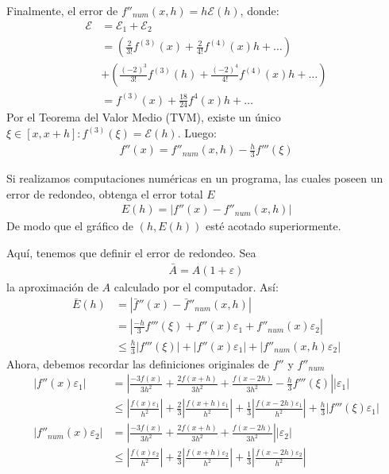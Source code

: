 Finalmente, el error de $f''_{num}(x,h)=h\mathcal{E}(h)$, donde:
\begin{align*}
    \mathcal{E}&=\mathcal{E}_1+\mathcal{E}_2\\
    &=\left(\frac{2}{3!}f^{(3)}(x)+\frac{2}{4!}f^{(4)}(x)h+\dots\right)\\
    &+\left(\frac{(-2)^3}{3!}f^{(3)}(h)+\frac{(-2)^4}{4!}f^{(4)}(x)h+\dots\right)\\
    &=f^{(3)}(x)+\frac{18}{24}f^{4}(x)h+\dots
\end{align*}
Por el Teorema del Valor Medio (TVM), existe un único $\xi \in [x,x+h]:f^{(3)}(\xi)=\mathcal{E}(h)$. Luego:
\begin{align*}
    f''(x)=f''_{num}(x,h)-\frac{h}{3}f'''(\xi)
\end{align*}
\begin{exercise}
    Si realizamos computaciones numéricas en un programa, las cuales poseen un error de redondeo, obtenga el error total $E$
    \begin{align*}
        E(h)=\left|f''(x)-f''_{num}(x,h)\right|
    \end{align*}
    De modo que el gráfico de $(h,E(h))$ esté acotado superiormente.
\end{exercise}
Aquí, tenemos que definir el error de redondeo. Sea
\begin{align*}
    \bar{A}=A(1+\varepsilon)
\end{align*}
la aproximación de $A$ calculado por el computador. Así:
\begin{align*}
    \bar{E}(h)&=\left|\bar{f}''(x)-\bar{f}''_{num}(x,h)\right|\\
    &=\left|\frac{-h}{3}f'''(\xi)+f''(x)\varepsilon_1+f''_{num}(x)\varepsilon_2\right|\\
    &\leq \frac{h}{3}|f'''(\xi)|+|f''(x)\varepsilon_1|+|f''_{num}(x,h)\varepsilon_2|
\end{align*}
Ahora, debemos recordar las definiciones originales de $f''$ y $f''_{num}$
\begin{align*}
    |f''(x)\varepsilon_1|&=\left|\frac{-3f(x)}{3h^2}+\frac{2f(x+h)}{3h^2}+\frac{f(x-2h)}{3h^2}-\frac{h}{3}f'''(\xi)\right||\varepsilon_1|\\
    &\leq \left|\frac{f(x)\varepsilon_1}{h^2}\right|+\frac{2}{3}\left|\frac{f(x+h)\varepsilon_1}{h^2}\right|+\frac{1}{3}\left|\frac{f(x-2h)\varepsilon_1}{h^2}\right|+\frac{h}{3}\left|f'''(\xi)\varepsilon_1\right|\\
    |f''_{num}(x)\varepsilon_2|&=\left|\frac{-3f(x)}{3h^2}+\frac{2f(x+h)}{3h^2}+\frac{f(x-2h)}{3h^2}\right||\varepsilon_2|\\
    &\leq \left|\frac{f(x)\varepsilon_2}{h^2}\right|+\frac{2}{3}\left|\frac{f(x+h)\varepsilon_2}{h^2}\right|+\frac{1}{3}\left|\frac{f(x-2h)\varepsilon_2}{h^2}\right|
\end{align*}
